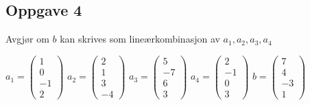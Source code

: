 \documentclass{article}
\newcommand{\vect}[1]{\begin{pmatrix} #1 \end{pmatrix}}
\begin{document}
\newpage
\subsection*{Oppgave 4}
Avgjør om $b$ kan skrives som lineærkombinasjon av $a_1, a_2, a_3, a_4$

\vspace{2em}
$a_1 = \vect{1\\0\\-1\\2}$
$a_2 = \vect{2\\1\\3\\-4}$
$a_3 = \vect{5\\-7\\6\\3}$
$a_4 = \vect{2\\-1\\0\\3}$
$b = \vect{7\\4\\-3\\1}$

\vspace{2em}
\end{document}
